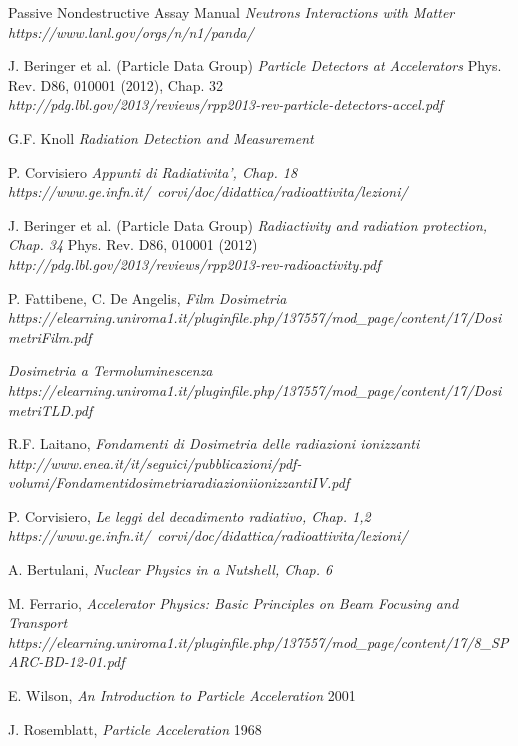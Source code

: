 \documentclass [a4paper, twoside] {book}
\begin{document}
\begin{thebibliography}{35}
Passive Nondestructive Assay Manual
\textit{Neutrons Interactions with Matter}
\\ \textit{https://www.lanl.gov/orgs/n/n1/panda/}

J. Beringer et al. (Particle Data Group)
\textit{Particle Detectors at Accelerators}
Phys. Rev. D86, 010001 (2012), Chap. 32
\\ \textit{http://pdg.lbl.gov/2013/reviews/rpp2013-rev-particle-detectors-accel.pdf}

G.F. Knoll
\textit{Radiation Detection and Measurement}

P. Corvisiero
\textit{Appunti di Radiativita', Chap. 18}
\\ \textit{https://www.ge.infn.it/~corvi/doc/didattica/radioattivita/lezioni/}

J. Beringer et al. (Particle Data Group)
\textit{Radiactivity and radiation protection, Chap. 34}
Phys. Rev. D86, 010001 (2012)
\\ \textit{http://pdg.lbl.gov/2013/reviews/rpp2013-rev-radioactivity.pdf}

P. Fattibene, C. De Angelis,
\textit{Film Dosimetria}
\\ \textit{https://elearning.uniroma1.it/pluginfile.php/137557/mod\_page/content/17/DosimetriFilm.pdf}

\textit{Dosimetria a Termoluminescenza}
\\ \textit{https://elearning.uniroma1.it/pluginfile.php/137557/mod\_page/content/17/DosimetriTLD.pdf}

R.F. Laitano,
\textit{Fondamenti di Dosimetria delle radiazioni ionizzanti}
\\ \textit{http://www.enea.it/it/seguici/pubblicazioni/pdf-volumi/FondamentidosimetriaradiazioniionizzantiIV.pdf}

P. Corvisiero,
\textit{Le leggi del decadimento radiativo, Chap. 1,2}
\\ \textit{https://www.ge.infn.it/~corvi/doc/didattica/radioattivita/lezioni/}

A. Bertulani,
\textit{Nuclear Physics in a Nutshell, Chap. 6}

M. Ferrario,
\textit{Accelerator Physics: Basic Principles on Beam Focusing and Transport}
\\ \textit{https://elearning.uniroma1.it/pluginfile.php/137557/mod\_page/content/17/8\_SPARC-BD-12-01.pdf}

E. Wilson,
\textit{An Introduction to Particle Acceleration}
2001

J. Rosemblatt,
\textit{Particle Acceleration}
1968




\end{thebibliography}
\end{document}
